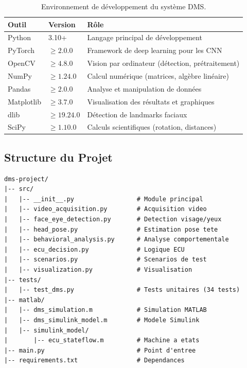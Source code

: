 \documentclass[12pt,a4paper,twoside]{report}
\begin{document}
\begin{table}[H]
\centering
\caption{Environnement de développement du système DMS.}
\label{tab:dev_env}
\renewcommand{\arraystretch}{1.3}
\begin{tabularx}{\textwidth}{|l|l|X|}
\hline
\rowcolor{stellantisblue!15}
\textbf{Outil} & \textbf{Version} & \textbf{Rôle} \\
\hline
Python & 3.10+ & Langage principal de développement \\
\hline
PyTorch & $\geq 2.0.0$ & Framework de deep learning pour les CNN \\
\hline
OpenCV & $\geq 4.8.0$ & Vision par ordinateur (détection, prétraitement) \\
\hline
NumPy & $\geq 1.24.0$ & Calcul numérique (matrices, algèbre linéaire) \\
\hline
Pandas & $\geq 2.0.0$ & Analyse et manipulation de données \\
\hline
Matplotlib & $\geq 3.7.0$ & Visualisation des résultats et graphiques \\
\hline
dlib & $\geq 19.24.0$ & Détection de landmarks faciaux \\
\hline
SciPy & $\geq 1.10.0$ & Calculs scientifiques (rotation, distances) \\
\hline
\end{tabularx}
\end{table}

\subsection{Structure du Projet}

\begin{lstlisting}[style=pythonstyle, caption={Structure du projet DMS.}, label={lst:project_structure}, language={}]
dms-project/
|-- src/
|   |-- __init__.py                 # Module principal
|   |-- video_acquisition.py        # Acquisition video
|   |-- face_eye_detection.py       # Detection visage/yeux
|   |-- head_pose.py                # Estimation pose tete
|   |-- behavioral_analysis.py      # Analyse comportementale
|   |-- ecu_decision.py             # Logique ECU
|   |-- scenarios.py                # Scenarios de test
|   |-- visualization.py            # Visualisation
|-- tests/
|   |-- test_dms.py                 # Tests unitaires (34 tests)
|-- matlab/
|   |-- dms_simulation.m            # Simulation MATLAB
|   |-- dms_simulink_model.m        # Modele Simulink
|   |-- simulink_model/
|       |-- ecu_stateflow.m         # Machine a etats
|-- main.py                         # Point d'entree
|-- requirements.txt                # Dependances
\end{lstlisting}
\end{document}
